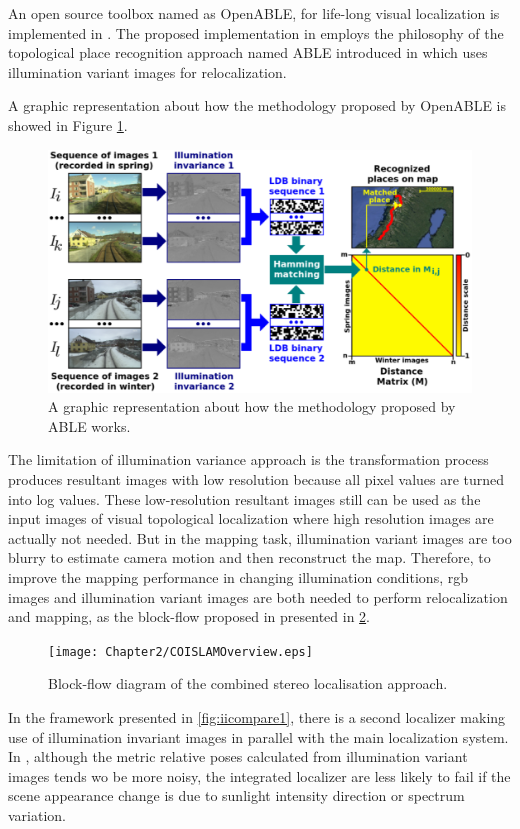 An open source toolbox named as OpenABLE, for life-long visual localization is implemented in \cite{arroyo2016openable}. The proposed implementation in \cite{arroyo2016openable} employs the philosophy of the topological place recognition approach named ABLE introduced in \cite{arroyo2014bidirectional, arroyo2014fast, arroyo2015towards} which uses illumination variant images for relocalization.

A graphic representation about how the methodology proposed by OpenABLE is showed in Figure \ref{fig:openableoverview}.

\begin{figure}[H]
	\centering
	\includegraphics[width=5in]{Chapter2/OPENABLEOverview.eps}
	\caption{A graphic representation about how the methodology proposed by ABLE works.}
	\label{fig:openableoverview} 
\end{figure}

The limitation of illumination variance approach is the transformation process produces resultant images with low resolution because all pixel values are turned into log values. These low-resolution resultant images still can be used as the input images of visual topological localization where high resolution images are actually not needed. But in the mapping task, illumination variant images are too blurry to estimate camera motion and then reconstruct the map. Therefore, to improve the mapping performance in changing illumination conditions, rgb images and illumination variant images are both needed to perform relocalization and mapping, as the block-flow proposed in \cite{mcmanus2014shady} presented in \ref{fig:iioverview}.

\begin{figure}[H]
	\centering
	\texttt{[image: Chapter2/COISLAMOverview.eps]}
	\caption{Block-flow diagram of the combined stereo localisation approach.}
	\label{fig:iioverview} 
\end{figure}

In the framework presented in \ref{fig:iicompare1}, there is a second localizer making use of illumination invariant images in parallel with the main localization system. In \cite{maddern2014illumination}, although the metric relative poses calculated from illumination variant images tends wo be more noisy, the integrated localizer are less likely to fail if the scene appearance change is due to sunlight intensity direction or spectrum variation.
\newpage
